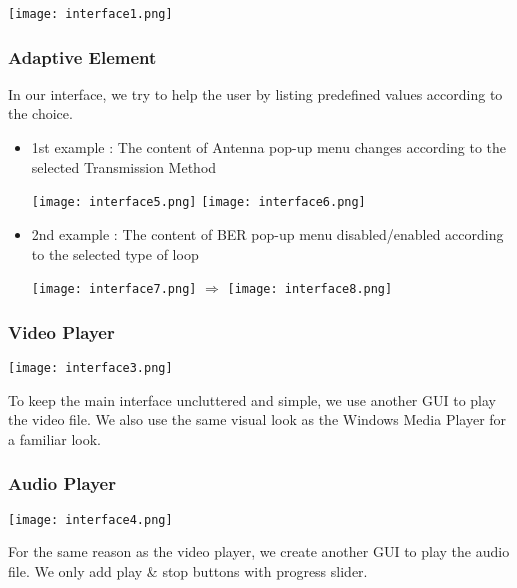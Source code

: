 \documentclass[12pt,a4paper]{article}
\begin{document}
\texttt{[image: interface1.png]}
\subsubsection{Adaptive Element}
In our interface, we try to help the user by listing predefined values according to the choice.
\begin{itemize}
	\item 1st example : The content of Antenna pop-up menu changes according to the selected Transmission Method
	\par \texttt{[image: interface5.png]}  \texttt{[image: interface6.png]}
	\item 2nd example : The content of BER pop-up menu disabled/enabled according to the selected type of loop
	\par \texttt{[image: interface7.png]} $\Rightarrow$ \texttt{[image: interface8.png]}
\end{itemize}

\subsubsection{Video Player}
\texttt{[image: interface3.png]}
\par \vspace{0.25cm}To keep the main interface uncluttered and simple, we use another GUI to play the video file. We also use the same visual look as the Windows Media Player for a familiar look.
\subsubsection{Audio Player}
\texttt{[image: interface4.png]}
\par \vspace{0.25cm}For the same reason as the video player, we create another GUI to play the audio file. We only add play \& stop buttons with progress slider.
\end{document}
